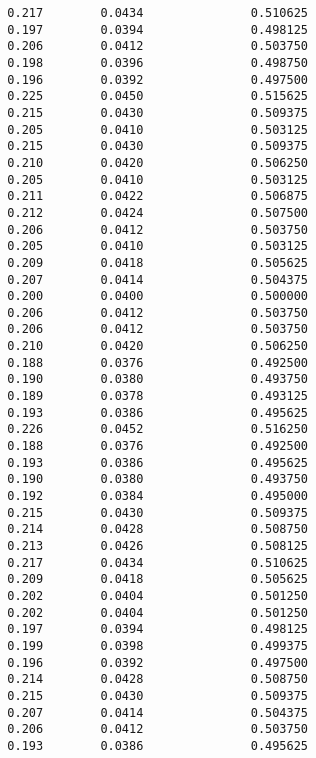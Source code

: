 \documentclass[
  letterpaper,
  DIV=11,
  numbers=noendperiod]{scrartcl}
\begin{document}
\begin{verbatim}
  0.217        0.0434               0.510625              
  0.197        0.0394               0.498125              
  0.206        0.0412               0.503750              
  0.198        0.0396               0.498750              
  0.196        0.0392               0.497500              
  0.225        0.0450               0.515625              
  0.215        0.0430               0.509375              
  0.205        0.0410               0.503125              
  0.215        0.0430               0.509375              
  0.210        0.0420               0.506250              
  0.205        0.0410               0.503125              
  0.211        0.0422               0.506875              
  0.212        0.0424               0.507500              
  0.206        0.0412               0.503750              
  0.205        0.0410               0.503125              
  0.209        0.0418               0.505625              
  0.207        0.0414               0.504375              
  0.200        0.0400               0.500000              
  0.206        0.0412               0.503750              
  0.206        0.0412               0.503750              
  0.210        0.0420               0.506250              
  0.188        0.0376               0.492500              
  0.190        0.0380               0.493750              
  0.189        0.0378               0.493125              
  0.193        0.0386               0.495625              
  0.226        0.0452               0.516250              
  0.188        0.0376               0.492500              
  0.193        0.0386               0.495625              
  0.190        0.0380               0.493750              
  0.192        0.0384               0.495000              
  0.215        0.0430               0.509375              
  0.214        0.0428               0.508750              
  0.213        0.0426               0.508125              
  0.217        0.0434               0.510625              
  0.209        0.0418               0.505625              
  0.202        0.0404               0.501250              
  0.202        0.0404               0.501250              
  0.197        0.0394               0.498125              
  0.199        0.0398               0.499375              
  0.196        0.0392               0.497500              
  0.214        0.0428               0.508750              
  0.215        0.0430               0.509375              
  0.207        0.0414               0.504375              
  0.206        0.0412               0.503750              
  0.193        0.0386               0.495625              

\end{verbatim}
\end{document}
